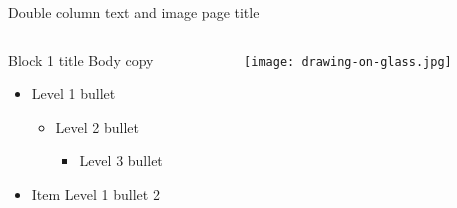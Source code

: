 \documentclass[t]{beamer}
\begin{document}
\begin{frame}{Double column text and image page title}
	\begin{columns}[T,totalwidth=\textwidth]
  		\begin{column}{0.45\textwidth}
  			\begin{block}{Block 1 title}
    				Body copy
    				\begin{itemize}    
    					\item Level 1 bullet
  					\begin{itemize}
  						\item Level 2 bullet
  						\begin{itemize}
  							\item Level 3 bullet
  						\end{itemize}
  					\end{itemize}
    					\item Item Level 1 bullet 2
    				\end{itemize}  
			\end{block}
  		\end{column} %
  		\begin{column}{0.45\textwidth}
			\begin{figure}
				\vspace{-\blocktitlesize}
				\texttt{[image: drawing-on-glass.jpg]}
			\end{figure}
  		\end{column}%
	\end{columns}
\end{frame}
\end{document}
